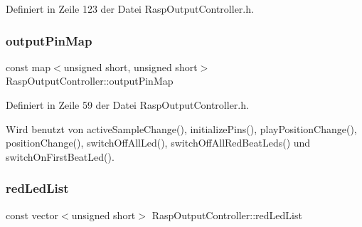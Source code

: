 Definiert in Zeile 123 der Datei Rasp\+Output\+Controller.\+h.

\mbox{\label{class_rasp_output_controller_afd8a9fff94ee9bcf63bcbe6fa810aa32}} 
\subsubsection{\texorpdfstring{output\+Pin\+Map}{outputPinMap}}
{\footnotesize\ttfamily const map$<$unsigned short, unsigned short$>$ Rasp\+Output\+Controller\+::output\+Pin\+Map\hspace{0.3cm}{\ttfamily [private]}}



Definiert in Zeile 59 der Datei Rasp\+Output\+Controller.\+h.



Wird benutzt von active\+Sample\+Change(), initialize\+Pins(), play\+Position\+Change(), position\+Change(), switch\+Off\+All\+Led(), switch\+Off\+All\+Red\+Beat\+Leds() und switch\+On\+First\+Beat\+Led().

\mbox{\label{class_rasp_output_controller_a8ee2d3ff908d1094cc9d1320133d0bdf}} 
\subsubsection{\texorpdfstring{red\+Led\+List}{redLedList}}
{\footnotesize\ttfamily const vector$<$unsigned short$>$ Rasp\+Output\+Controller\+::red\+Led\+List\hspace{0.3cm}{\ttfamily [private]}}

